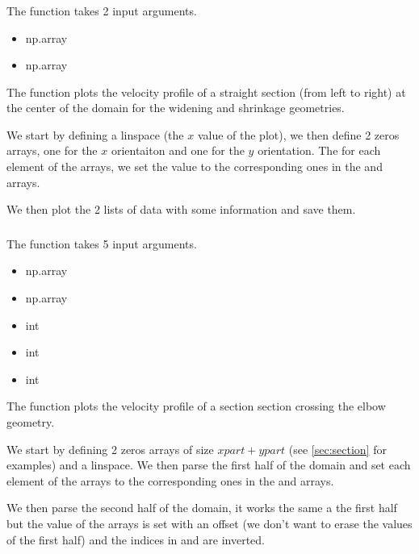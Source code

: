 \subsubsection{}
The function \textcolor{func}{} takes 2 input
arguments.
\begin{itemize}
      \item {} \textcolor{dtype}{np.array}
      \item {} \textcolor{dtype}{np.array}
\end{itemize}
The function plots the velocity profile of a straight section (from left to
right) at the center of the domain for the widening and shrinkage geometries.

We start by defining a linspace (the $x$ value of the plot), we then define
2 zeros arrays, one for the $x$ orientaiton and one for the $y$ orientation.
The for each element of the arrays, we set the value to the corresponding ones
in the  and  arrays.

We then plot the 2 lists of data with some information and save them.

\subsubsection{}
The function \textcolor{func}{} takes 5 input arguments.
\begin{itemize}
      \item {} \textcolor{dtype}{np.array}
      \item {} \textcolor{dtype}{np.array}
      \item {} \textcolor{dtype}{int}
      \item {} \textcolor{dtype}{int}
      \item {} \textcolor{dtype}{int}
\end{itemize}
The function plots the velocity profile of a section section crossing the elbow
geometry.

We start by defining 2 zeros arrays of size $xpart + ypart$ (see
\autoref{sec:section} for examples) and a linspace. We then parse the first
half of the domain and set each element of the arrays to the corresponding ones
in the  and  arrays.

We then parse the second half of the domain, it works the same a the first half
but the value of the arrays is set with an offset (we don't want to erase the
values of the first half) and the indices in  and  are
inverted.

